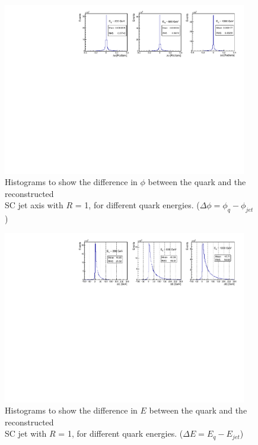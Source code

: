 \documentclass[a4paper,11pt, onecolumn]{article}
\begin{document}
 \begin{figure}[!htb]
    \begin{center}
      \includegraphics[width = 0.95\textwidth]{scq_phi}
      \caption{Histograms to show the difference in $\phi$ between the quark and the reconstructed \\
               SC jet axis with $R$ = 1, for different quark energies.  ($\Delta\phi = \phi_{q}-\phi_{jet}$) }
      \label{scq phi}
    \end{center}
  \end{figure}
 
  \begin{figure}[!htb]   
    \vspace{-0.5cm}
    \begin{center}
      \includegraphics[width = 0.95\textwidth]{scq_E}
      \caption{Histograms to show the difference in $E$ between the quark and the reconstructed \\
               SC jet with $R$ = 1, for different quark energies. ($\Delta E = E_{q}-E_{jet}$)}
      \label{scq E}
    \end{center}
    \vspace{-0.25cm}
  \end{figure}
\end{document}
